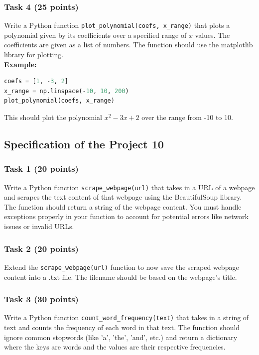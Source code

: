 \documentclass[12pt]{article}
\begin{document}
\subsubsection{Task 4 (25 points)}
Write a Python function \texttt{plot\_polynomial(coefs, x\_range)} that plots a polynomial given by its coefficients over a specified range of $x$ values. The coefficients are given as a list of numbers. The function should use the matplotlib library for plotting. \\
\textbf{Example:}
\begin{lstlisting}[language=Python]
coefs = [1, -3, 2]
x_range = np.linspace(-10, 10, 200)
plot_polynomial(coefs, x_range)
\end{lstlisting}
This should plot the polynomial $x^2 - 3x + 2$ over the range from -10 to 10.
\newpage
\subsection{Specification of the Project 10}

\subsubsection{Task 1 (20 points)}
Write a Python function \texttt{scrape\_webpage(url)} that takes in a URL of a webpage and scrapes the text content of that webpage using the BeautifulSoup library. The function should return a string of the webpage content. You must handle exceptions properly in your function to account for potential errors like network issues or invalid URLs.

\subsubsection{Task 2 (20 points)}
Extend the \texttt{scrape\_webpage(url)} function to now save the scraped webpage content into a .txt file. The filename should be based on the webpage's title.

\subsubsection{Task 3 (30 points)}
Write a Python function \texttt{count\_word\_frequency(text)} that takes in a string of text and counts the frequency of each word in that text. The function should ignore common stopwords (like 'a', 'the', 'and', etc.) and return a dictionary where the keys are words and the values are their respective frequencies.
\end{document}
